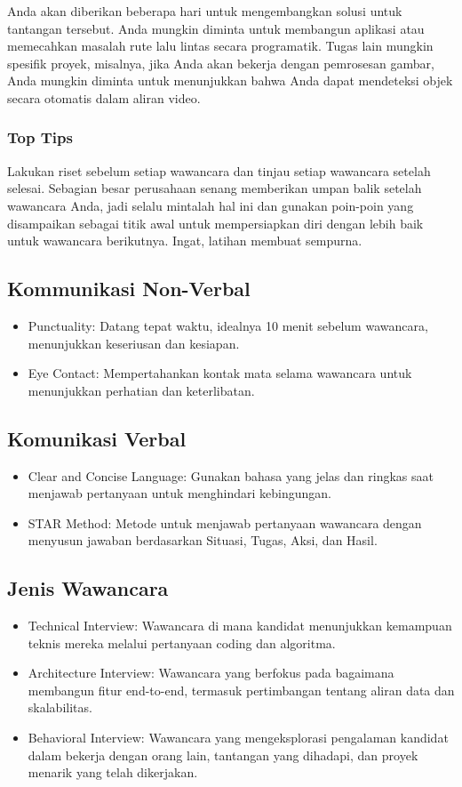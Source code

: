 \documentclass{article}
\begin{document}
Anda akan diberikan beberapa hari untuk mengembangkan solusi untuk tantangan tersebut. Anda mungkin diminta untuk membangun aplikasi atau memecahkan masalah rute lalu lintas secara programatik. Tugas lain mungkin spesifik proyek, misalnya, jika Anda akan bekerja dengan pemrosesan gambar, Anda mungkin diminta untuk menunjukkan bahwa Anda dapat mendeteksi objek secara otomatis dalam aliran video.

\subsubsection{Top Tips}
Lakukan riset sebelum setiap wawancara dan tinjau setiap wawancara setelah selesai. Sebagian besar perusahaan senang memberikan umpan balik setelah wawancara Anda, jadi selalu mintalah hal ini dan gunakan poin-poin yang disampaikan sebagai titik awal untuk mempersiapkan diri dengan lebih baik untuk wawancara berikutnya. Ingat, latihan membuat sempurna.

\subsection{Kommunikasi Non-Verbal}
\begin{itemize}
    \item Punctuality: Datang tepat waktu, idealnya 10 menit sebelum wawancara, menunjukkan keseriusan dan kesiapan.
    \item Eye Contact: Mempertahankan kontak mata selama wawancara untuk menunjukkan perhatian dan keterlibatan.
\end{itemize}

\subsection{Komunikasi Verbal}
\begin{itemize}
    \item Clear and Concise Language: Gunakan bahasa yang jelas dan ringkas saat menjawab pertanyaan untuk menghindari kebingungan.
    \item STAR Method: Metode untuk menjawab pertanyaan wawancara dengan menyusun jawaban berdasarkan Situasi, Tugas, Aksi, dan Hasil.
\end{itemize}

\subsection{Jenis Wawancara}
\begin{itemize}
    \item Technical Interview: Wawancara di mana kandidat menunjukkan kemampuan teknis mereka melalui pertanyaan coding dan algoritma.
    \item Architecture Interview: Wawancara yang berfokus pada bagaimana membangun fitur end-to-end, termasuk pertimbangan tentang aliran data dan skalabilitas.
    \item Behavioral Interview: Wawancara yang mengeksplorasi pengalaman kandidat dalam bekerja dengan orang lain, tantangan yang dihadapi, dan proyek menarik yang telah dikerjakan.
\end{itemize}
\end{document}
